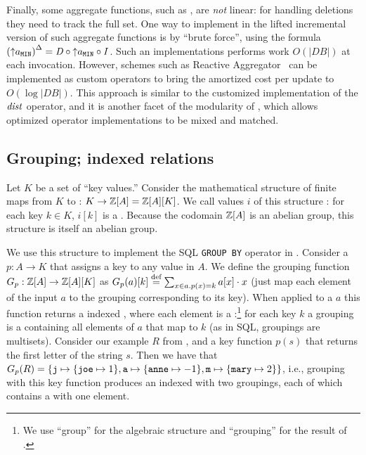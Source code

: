 Finally, some aggregate functions, such as , are
\emph{not} linear: for handling deletions
they need to track the full set.  One way to implement in \dbsp the lifted
incremental version of such aggregate functions is
by ``brute force'', using the formula ${({\uparrow}a_\texttt{MIN})}^{\Delta}
= \mathit{D} \circ {\uparrow}a_\texttt{MIN} \circ \mathit{I}$.  Such an implementations performs work
$O(|DB|)$ at each invocation.  However, schemes
such as Reactive Aggregator~\cite{tangwongsan-vldb15} can be implemented as custom \dbsp operators to bring
the amortized cost per update to $O(\log |DB|)$.  This approach is similar to the
customized implementation of the $\mathit{dist}$ operator, and it is another facet of
the modularity of \dbsp, which allows optimized operator implementations to be
mixed and matched.

\subsection{Grouping; indexed relations}\label{sec:grouping}

Let $K$ be a set of ``key values.''
Consider the mathematical structure of finite maps from $K$
to \zrs: $K \to \mathbb{Z}[A] = \mathbb{Z}[A][K]$.
We call values $i$ of this structure : for
each key $k \in K$, $i[k]$ is a \zr.  Because
the codomain $\mathbb{Z}[A]$ is an abelian group, this structure is itself
an abelian group.

We use this structure to implement the SQL \texttt{GROUP BY} operator in \dbsp.
Consider a 
$p: A \to K$ that assigns a key to any value in $A$.  We define the grouping function
$G_p: \mathbb{Z}[A] \to \mathbb{Z}[A][K]$ as $G_p(a)[k] \stackrel{\textrm{\scriptsize def}}{=} \sum_{x \in a.p(x)=k}a[x] \cdot x$
(just map each element of the input $a$ to the \zr grouping corresponding to its key).
When applied to a \zr $a$ this function returns a indexed \zr, where each element
is a :\footnote{We use
``group'' for the algebraic structure and ``grouping'' for the result of .} for each key $k$ a
grouping is a \zr containing all elements of $a$ that map to $k$
(as in SQL, groupings are multisets).
Consider our example \zr $R$ from ,
and a key function $p(s)$ that returns the first letter of the string
$s$. Then we have that $G_p(R) = \{ \mbox{\texttt{j}} \mapsto \{ \mbox{\texttt{joe}}
\mapsto 1 \}, \mbox{\texttt{a}} \mapsto \{ \mbox{\texttt{anne}} \mapsto -1 \}, \mbox{\texttt{m}}
\mapsto \{ \mbox{\texttt{mary}} \mapsto 2 \} \}$,
i.e., grouping with this key function produces an indexed \zr with two groupings, each
of which contains a \zr with one element.

